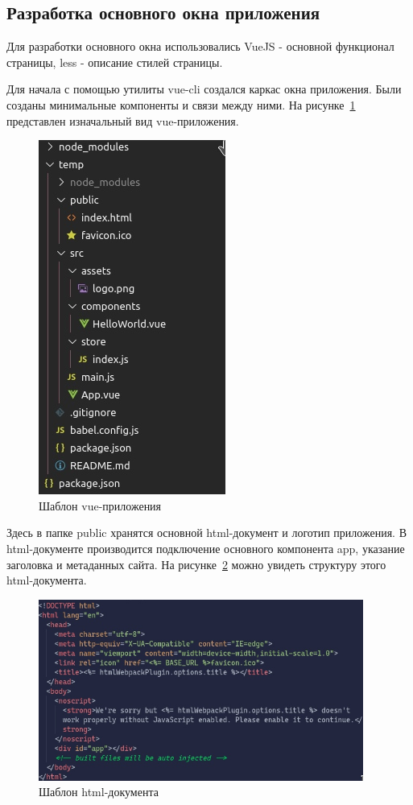\subsection{Разработка основного окна приложения}

Для разработки основного окна использовались VueJS - основной функционал страницы, less - описание стилей страницы.

Для начала с помощью утилиты vue-cli создался каркас окна приложения. Были созданы минимальные компоненты и связи между ними. На рисунке~\ref{img:vueTemp} представлен изначальный вид vue-приложения.

\begin{figure}[H]
  \centering
  \includegraphics{TexModules/pics/vue_temp.jpg}
  \caption{Шаблон vue-приложения}
  \label{img:vueTemp}
\end{figure}

Здесь в папке public хранятся основной html-документ и логотип приложения. В html-документе производится подключение основного компонента app, указание заголовка и метаданных сайта. На рисунке~\ref{img:htmlTemp} можно увидеть структуру этого html-документа.

\begin{figure}[H]
  \centering
  \includegraphics[width=0.95\textwidth]{TexModules/pics/htmlTemp.jpg}
  \caption{Шаблон html-документа}
  \label{img:htmlTemp}
\end{figure}

